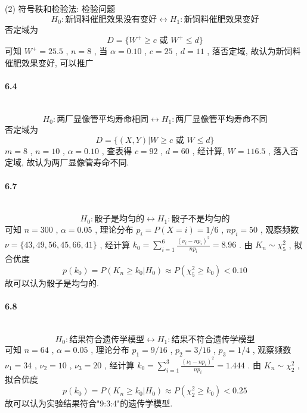 \documentclass[UTF8]{ctexart}
\begin{document}
        \noindent(2) 符号秩和检验法: 检验问题
        \[H_0 : \text{新饲料催肥效果没有变好} \leftrightarrow H_1 : \text{新饲料催肥效果变好}\]
        否定域为
        \[D=\{W^+ \ge c \text{ 或 } W^+ \le d\}\]
        可知 $W^+ = 25.5$ , $n = 8$ , 当 $\alpha = 0.10$ , $c = 25$ , $d = 11$ ,
        落否定域, 故认为新饲料催肥效果变好, 可以推广\\
    
    \paragraph{6.4}\quad\\
        \[H_0 : \text{两厂显像管平均寿命相同} \leftrightarrow H_1 : \text{两厂显像管平均寿命不同}\]
        否定域为
        \[D=\{(X,Y)|W \ge c \text{ 或 } W \le d\}\]
        $m = 8$ , $n = 10$ , $\alpha = 0.10$ , 查表得 $c = 92$ , $d = 60$ , 经计算, $W = 116.5$ , 落入否定域, 故认为两厂显像管寿命不同.\\
    
    \paragraph{6.7}\quad\\
        \[H_0 : \text{骰子是均匀的} \leftrightarrow H_1 : \text{骰子不是均匀的}\]
        可知 $n = 300$ , $\alpha = 0.05$ , 理论分布 $p_i = P(X = i) = 1/6$ , $n p_i = 50$ , 观察频数 $\nu = \{43, 49, 56, 45, 66, 41\}$ , 经计算 $k_0 = \sum^{6}_{i = 1}\frac{(\nu_i - n p_i)^2}{n p_i} = 8.96$ .
        由 $K_n \sim \chi^2_5$ , 拟合优度 
        \[p(k_0) = P(K_n \ge k_0 | H_0) \approx P(\chi^2_5 \ge k_0) < 0.10 \]
        故可以认为骰子是均匀的.\\
    
    \paragraph{6.8}\quad\\
        \[H_0 : \text{结果符合遗传学模型} \leftrightarrow H_1 : \text{结果不符合遗传学模型}\]
        可知 $n = 64$ , $\alpha = 0.05$ , 理论分布 $p_1 = 9/16$ , $p_2 = 3/16$ , $p_3 = 1/4$ , 观察频数 $\nu_1 = 34$ , $\nu_2 = 10$ , $\nu_3 = 20$ , 经计算 $k_0 = \sum^{3}_{i = 1}\frac{(\nu_i - n p_i)^2}{n p_i} = 1.444$ .
        由 $K_n \sim \chi^2_2$ , 拟合优度 
        \[p(k_0) = P(K_n \ge k_0 | H_0) \approx P(\chi^2_2 \ge k_0) < 0.25 \]
        故可以认为实验结果符合"9:3:4"的遗传学模型.\\

    
\end{document}
